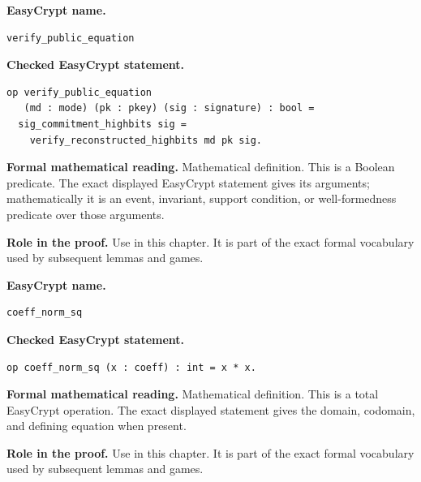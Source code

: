 \begin{formaldefinition}
\noindent\textbf{EasyCrypt name.}
\begin{lstlisting}[language=EasyCrypt,basicstyle=\ttfamily\scriptsize]
verify_public_equation
\end{lstlisting}
\noindent\textbf{Checked EasyCrypt statement.}
\begin{lstlisting}[language=EasyCrypt,basicstyle=\ttfamily\scriptsize]
op verify_public_equation
   (md : mode) (pk : pkey) (sig : signature) : bool =
  sig_commitment_highbits sig =
    verify_reconstructed_highbits md pk sig.
\end{lstlisting}
\noindent\textbf{Formal mathematical reading.}
Mathematical definition. This is a Boolean predicate.  The exact displayed EasyCrypt statement gives its arguments; mathematically it is an event, invariant, support condition, or well-formedness predicate over those arguments.

\noindent\textbf{Role in the proof.}
Use in this chapter. It is part of the exact formal vocabulary used by subsequent lemmas and games.

\end{formaldefinition}

\begin{formaldefinition}
\noindent\textbf{EasyCrypt name.}
\begin{lstlisting}[language=EasyCrypt,basicstyle=\ttfamily\scriptsize]
coeff_norm_sq
\end{lstlisting}
\noindent\textbf{Checked EasyCrypt statement.}
\begin{lstlisting}[language=EasyCrypt,basicstyle=\ttfamily\scriptsize]
op coeff_norm_sq (x : coeff) : int = x * x.
\end{lstlisting}
\noindent\textbf{Formal mathematical reading.}
Mathematical definition. This is a total EasyCrypt operation.  The exact displayed statement gives the domain, codomain, and defining equation when present.

\noindent\textbf{Role in the proof.}
Use in this chapter. It is part of the exact formal vocabulary used by subsequent lemmas and games.

\end{formaldefinition}

